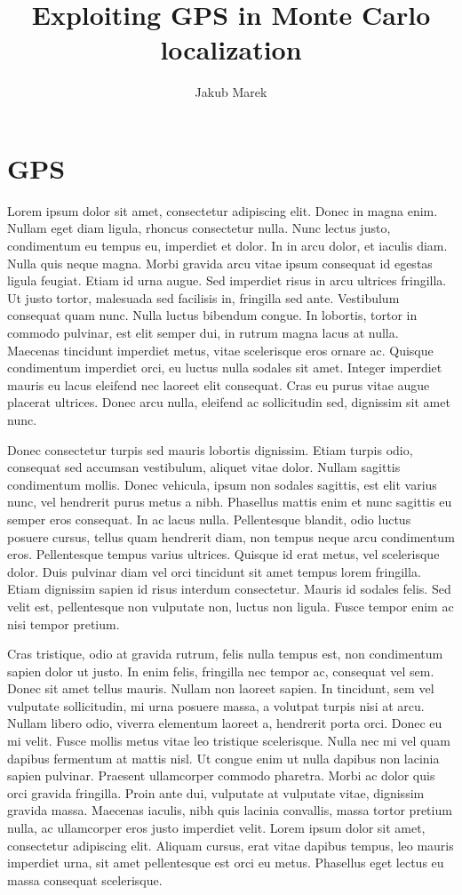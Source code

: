 \documentclass[11pt,a4paper,pdftex,twoside]{memoir}
\title{Exploiting GPS in Monte Carlo localization}
\author{Jakub Marek}
\begin{document}






\chapter{GPS}
Lorem ipsum dolor sit amet, consectetur adipiscing elit. Donec in magna enim. Nullam eget diam ligula, rhoncus consectetur nulla. Nunc lectus justo, condimentum eu tempus eu, imperdiet et dolor. In in arcu dolor, et iaculis diam. Nulla quis neque magna. Morbi gravida arcu vitae ipsum consequat id egestas ligula feugiat. Etiam id urna augue. Sed imperdiet risus in arcu ultrices fringilla. Ut justo tortor, malesuada sed facilisis in, fringilla sed ante. Vestibulum consequat quam nunc. Nulla luctus bibendum congue. In lobortis, tortor in commodo pulvinar, est elit semper dui, in rutrum magna lacus at nulla. Maecenas tincidunt imperdiet metus, vitae scelerisque eros ornare ac. Quisque condimentum imperdiet orci, eu luctus nulla sodales sit amet. Integer imperdiet mauris eu lacus eleifend nec laoreet elit consequat. Cras eu purus vitae augue placerat ultrices. Donec arcu nulla, eleifend ac sollicitudin sed, dignissim sit amet nunc.

Donec consectetur turpis sed mauris lobortis dignissim. Etiam turpis odio, consequat sed accumsan vestibulum, aliquet vitae dolor. Nullam sagittis condimentum mollis. Donec vehicula, ipsum non sodales sagittis, est elit varius nunc, vel hendrerit purus metus a nibh. Phasellus mattis enim et nunc sagittis eu semper eros consequat. In ac lacus nulla. Pellentesque blandit, odio luctus posuere cursus, tellus quam hendrerit diam, non tempus neque arcu condimentum eros. Pellentesque tempus varius ultrices. Quisque id erat metus, vel scelerisque dolor. Duis pulvinar diam vel orci tincidunt sit amet tempus lorem fringilla. Etiam dignissim sapien id risus interdum consectetur. Mauris id sodales felis. Sed velit est, pellentesque non vulputate non, luctus non ligula. Fusce tempor enim ac nisi tempor pretium.

Cras tristique, odio at gravida rutrum, felis nulla tempus est, non condimentum sapien dolor ut justo. In enim felis, fringilla nec tempor ac, consequat vel sem. Donec sit amet tellus mauris. Nullam non laoreet sapien. In tincidunt, sem vel vulputate sollicitudin, mi urna posuere massa, a volutpat turpis nisi at arcu. Nullam libero odio, viverra elementum laoreet a, hendrerit porta orci. Donec eu mi velit. Fusce mollis metus vitae leo tristique scelerisque. Nulla nec mi vel quam dapibus fermentum at mattis nisl. Ut congue enim ut nulla dapibus non lacinia sapien pulvinar. Praesent ullamcorper commodo pharetra. Morbi ac dolor quis orci gravida fringilla. Proin ante dui, vulputate at vulputate vitae, dignissim gravida massa. Maecenas iaculis, nibh quis lacinia convallis, massa tortor pretium nulla, ac ullamcorper eros justo imperdiet velit. Lorem ipsum dolor sit amet, consectetur adipiscing elit. Aliquam cursus, erat vitae dapibus tempus, leo mauris imperdiet urna, sit amet pellentesque est orci eu metus. Phasellus eget lectus eu massa consequat scelerisque.
\end{document}
